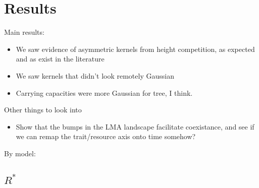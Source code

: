\documentclass[a4paper,11pt]{article}
\newcommand{\Rstar}{\ensuremath{R^*}}
\newcommand{\TREE}{{\sc tree}}
\begin{document}

\clearpage

\section{Results}

Main results:

\begin{itemize}
\item We saw evidence of asymmetric kernels from height competition,
  as expected and as exist in the literature
\item We saw kernels that didn't look remotely Gaussian
\item Carrying capacities were more Gaussian for \TREE, I think.
\end{itemize}

Other things to look into

\begin{itemize}
\item Show that the bumps in the LMA landscape facilitate coexistance,
  and see if we can remap the trait/resource axis onto time somehow?
\end{itemize}

By model:

\subsection{\Rstar}
\end{document}
